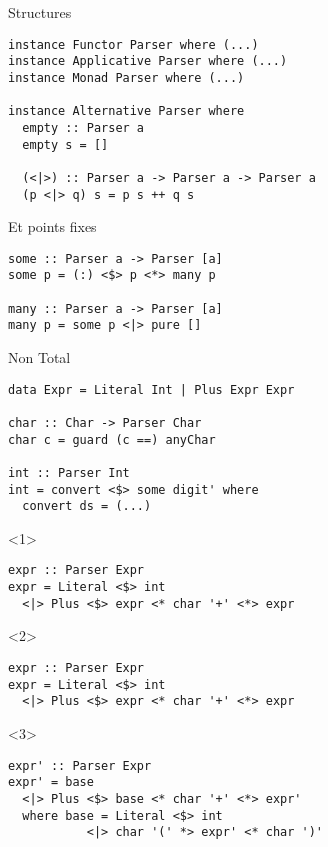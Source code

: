 \documentclass{beamer}
\begin{document}
\begin{frame}[fragile]{Structures}
\begin{verbatim}
instance Functor Parser where (...)
instance Applicative Parser where (...)
instance Monad Parser where (...)

instance Alternative Parser where
  empty :: Parser a
  empty s = []

  (<|>) :: Parser a -> Parser a -> Parser a
  (p <|> q) s = p s ++ q s
\end{verbatim}
\end{frame}

\begin{frame}[fragile]{Et points fixes}
\begin{verbatim}
some :: Parser a -> Parser [a]
some p = (:) <$> p <*> many p

many :: Parser a -> Parser [a]
many p = some p <|> pure []
\end{verbatim}
\end{frame}

\begin{frame}[fragile]{Non Total}
\begin{verbatim}
data Expr = Literal Int | Plus Expr Expr

char :: Char -> Parser Char
char c = guard (c ==) anyChar

int :: Parser Int
int = convert <$> some digit' where
  convert ds = (...)
\end{verbatim}
\begin{onlyenv}<1>
\begin{verbatim}
expr :: Parser Expr
expr = Literal <$> int
  <|> Plus <$> expr <* char '+' <*> expr
\end{verbatim}
\end{onlyenv}
\begin{onlyenv}<2>
\begin{mdframed}[backgroundcolor=lightgray]
\begin{verbatim}
expr :: Parser Expr
expr = Literal <$> int
  <|> Plus <$> expr <* char '+' <*> expr
\end{verbatim}
\end{mdframed}
\end{onlyenv}
\begin{onlyenv}<3>
\begin{verbatim}
expr' :: Parser Expr
expr' = base
  <|> Plus <$> base <* char '+' <*> expr'
  where base = Literal <$> int
           <|> char '(' *> expr' <* char ')'
\end{verbatim}
\end{onlyenv}
\end{frame}
\end{document}
